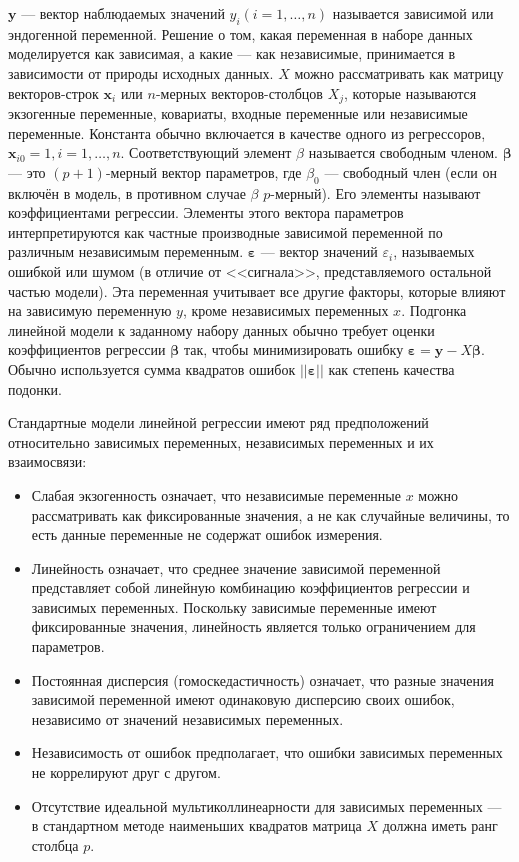 $\mathbf{y}$ --- вектор наблюдаемых значений $y_{i}\left(i = 1, \ldots, n\right)$ называется зависимой или эндогенной переменной. Решение о том, какая переменная в наборе данных моделируется как зависимая, а какие --- как независимые, принимается в зависимости от природы исходных данных. $X$ можно рассматривать как матрицу векторов-строк $\mathbf{x}_{i}$ или $n$-мерных векторов-столбцов $X_{j}$, которые называются экзогенные переменные, ковариаты, входные переменные или независимые переменные. Константа обычно включается в качестве одного из регрессоров, $\mathbf{x}_{i0} = 1, i = 1, \ldots, n$. Соответствующий элемент $\beta$ называется свободным членом. $\boldsymbol{\beta}$ --- это $(p + 1)$-мерный вектор параметров, где $\beta_{0}$ --- свободный член (если он включён в модель, в противном случае ${\beta}$ $p$-мерный). Его элементы называют коэффициентами регрессии. Элементы этого вектора параметров интерпретируются как частные производные зависимой переменной по различным независимым переменным. ${\boldsymbol{\varepsilon}}$ --- вектор значений $\varepsilon_{i}$, называемых ошибкой или шумом (в отличие от <<сигнала>>, представляемого остальной частью модели). Эта переменная учитывает все другие факторы, которые влияют на зависимую переменную $y$, кроме независимых переменных $x$.
Подгонка линейной модели к заданному набору данных обычно требует оценки коэффициентов регрессии ${\boldsymbol{\beta}}$ так, чтобы минимизировать ошибку ${\boldsymbol{\varepsilon}} = \mathbf{y} - X{\boldsymbol{\beta}}$. Обычно используется сумма квадратов ошибок $||{\boldsymbol{\varepsilon}}||$ как степень качества подонки.

Стандартные модели линейной регрессии имеют ряд предположений относительно зависимых переменных, независимых переменных и их взаимосвязи:
\begin{itemize}
	\item Слабая экзогенность означает, что независимые переменные $x$ можно рассматривать как фиксированные значения, а не как случайные величины, то есть данные переменные не содержат ошибок измерения. 
	\item Линейность означает, что среднее значение зависимой переменной представляет собой линейную комбинацию коэффициентов регрессии и зависимых переменных. Поскольку зависимые переменные имеют фиксированные значения, линейность является только ограничением для параметров. 
	\item Постоянная дисперсия (гомоскедастичность) означает, что разные значения зависимой переменной имеют одинаковую дисперсию своих ошибок, независимо от значений независимых переменных. 
	\item Независимость от ошибок предполагает, что ошибки зависимых переменных не коррелируют друг с другом. 
	\item Отсутствие идеальной мультиколлинеарности для зависимых переменных --- в стандартном методе наименьших квадратов матрица $X$ должна иметь ранг столбца $p$. 
\end{itemize}


